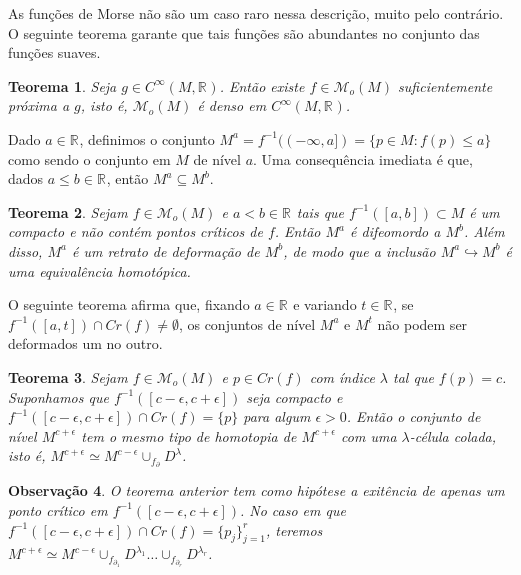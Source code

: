 \documentclass{beamer}
\newtheorem{teorema}{Teorema}[section]
\newtheorem{observacao}[teorema]{Observação}
\newcommand{\funcoesmorse}[1]{\mathcal{M}_{o}(#1)}
\newcommand{\funcoessuaves}[1]{C^{\infty}(#1, \real{})}
\newcommand{\pontoscriticos}[1]{\textit{Cr}(#1)}
\newcommand{\real}[1]{\mathbb{R}^{#1}}
\newcommand{\reta}{\real{}}
\begin{document}
\begin{frame}
	As funções de Morse não são um caso raro nessa descrição, muito pelo contrário. O seguinte teorema garante que tais funções são abundantes no conjunto das funções suaves.
	\begin{teorema}
		Seja $g\in \funcoessuaves{M}$. Então existe $f \in \funcoesmorse{M}$ suficientemente próxima a $g$, isto é, $\funcoesmorse{M}$ é denso em $\funcoessuaves{M}$.
	\end{teorema}
\end{frame}
	
\begin{frame}
	Dado $a \in \reta$, definimos o conjunto $M^{a}= f^{-1}((-\infty, a]) = \{p \in M: f(p)\leq a\}$ como sendo o conjunto em $M$ de nível $a$. Uma consequência imediata é que, dados $a\leq b \in \reta$, então $M^{a} \subseteq M^{b}$.
	
	\begin{teorema}
		Sejam $f \in \funcoesmorse{M}$ e $a<b \in \reta$ tais que $f^{-1}([a,b])\subset M$ é um compacto e não contém pontos críticos de $f$. Então $M^{a}$ é difeomordo a $M^{b}$. Além disso, $M^{a}$ é um retrato de deformação de $M^{b}$, de modo que a inclusão  $M^{a} \hookrightarrow M^{b}$ é uma equivalência homotópica.
	\end{teorema}
	
\end{frame}

\begin{frame}
	O seguinte teorema afirma que, fixando $a \in \reta$ e variando $t \in \reta$, se $f^{-1}([a,t]) \cap \pontoscriticos{f} \neq \emptyset$, os conjuntos de nível $M^{a}$ e $M^{t}$ não podem ser deformados um no outro.
	
	\begin{teorema}
		Sejam $f\in \funcoesmorse{M}$ e $p\in \pontoscriticos{f}$ com índice $\lambda$ tal que $f(p) = c$. Suponhamos que $f^{-1}([c-\epsilon,c+\epsilon])$ seja compacto e $f^{-1}([c-\epsilon,c+\epsilon])\cap \pontoscriticos{f} = \{p\}$ para algum $\epsilon>0$. Então o conjunto de nível $M^{c+\epsilon}$ tem o mesmo tipo de homotopia de $M^{c+\epsilon}$ com uma $\lambda$-célula colada, isto é, $M^{c+\epsilon} \simeq M^{c-\epsilon}\cup_{f_{\partial}} D^{\lambda}$.
	\end{teorema}
	\begin{observacao}
		O teorema anterior tem como hipótese a exitência de apenas um ponto crítico em $f^{-1}([c-\epsilon,c+\epsilon])$. No caso em que $f^{-1}([c-\epsilon,c+\epsilon]) \cap \pontoscriticos{f} = \{p_{j}\}_{j=1}^{r}$, teremos $M^{c+\epsilon} \simeq M^{c-\epsilon}\cup_{f_{\partial_{1}}} D^{\lambda_{1}}\dots  \cup_{f_{\partial_{r}}} D^{\lambda_{r}}$.
	\end{observacao}
\end{frame}
\end{document}
